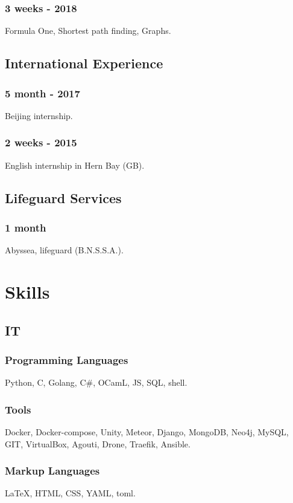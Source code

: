 \documentclass{article}
\begin{document}
\begin{multicols}{2}
                \subsubsection{3 weeks - 2018}
                    Formula One, Shortest path finding, Graphs.
            \subsection{International Experience}
                \subsubsection{5 month - 2017}
                    Beijing internship.
                \subsubsection{2 weeks - 2015}
                    English internship in Hern Bay (GB).
            \subsection{Lifeguard Services}
                \subsubsection{1 month}
                    Abyssea, lifeguard (B.N.S.S.A.).

        \columnbreak

        \section{Skills}
            \subsection{IT}
                \subsubsection{Programming Languages}
                    Python, C, Golang, C\#, OCamL, JS, SQL, shell.
                \subsubsection{Tools}
                    Docker, Docker-compose, Unity, Meteor, Django,  MongoDB, Neo4j, MySQL, GIT, VirtualBox, Agouti, Drone, Traefik, Ansible.
                \subsubsection{Markup Languages}
                    {\LaTeX}, HTML, CSS, YAML, toml.

\end{multicols}
\end{document}
